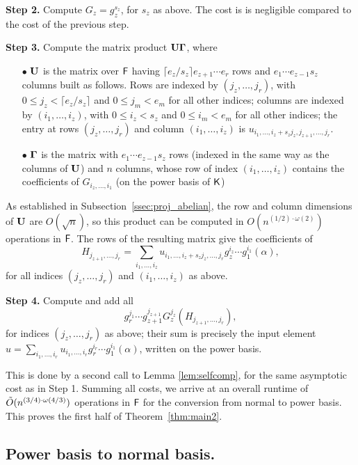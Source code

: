 \smallskip\noindent\textbf{Step 2.} Compute $G_z=g_z^{s_z}$, for $s_z$
as above. The cost is is negligible compared to the cost of the
previous step.

\smallskip\noindent\textbf{Step 3.} Compute the matrix product 
$\mat U \mat \Gamma$, where
\begin{itemize}
\item[$\bullet$] $\mat U$ is the matrix over ${\mathsf{F}}$ having $\lceil
  e_z/s_z\rceil e_{z+1} \cdots e_r$ rows and $e_1 \cdots e_{z-1} s_z$
  columns built as follows. Rows are indexed by $(j_z,\dots,j_r)$,
  with $0\le j_z < \lceil e_z/s_z\rceil$ and $0 \le j_m < e_m$ for all
  other indices; columns are indexed by $(i_1,\dots,i_z)$, with $0\le
  i_z < s_z$ and $0 \le i_m < e_m$ for all other indices; the entry at
  rows $(j_z,\dots,j_r)$ and column $(i_1,\dots,i_z)$ is
  $u_{i_1,\dots,i_z + s_z j_z, j_{z+1},\dots,j_r}$.
\item[$\bullet$] $\mat \Gamma$ is the matrix with $e_1 \cdots e_{z-1}
  s_z$ rows (indexed in the same way as the columns of $\mat U$) and $n$
  columns, whose row of index $(i_1,\dots,i_z)$ contains the
  coefficients of $ G_{i_z,\dots,i_1}$ (on the power basis of ${\mathsf{K}}$)
\end{itemize}
As established in Subsection~\ref{ssec:proj_abelian}, the row and column
dimensions of $\mat U$ are $O(\sqrt n)$, so this product can 
be computed in $O(n^{(1/2)\cdot\omega(2)})$ operations in ${\mathsf{F}}$. The rows of 
the resulting matrix give the coefficients of 
$$ H_{j_{z+1},\dots,j_r} = \sum_{i_1,\dots,i_z} u_{i_1,\dots,i_z+s_z j_z,\dots,j_r} g_z^{i_z} \cdots
g_1^{i_1}(\alpha),$$
for all indices $(j_z,\dots,j_r)$ and $(i_1,\dots,i_z)$ as above.

\smallskip\noindent\textbf{Step 4.} Compute and add all
$$g_r^{j_1} \cdots g_{z+1}^{j_{z+1}} G_z^{j_z} ( H_{j_{z+1},\dots,j_r}
),$$ for indices $(j_z,\dots,j_r)$ as above; their sum is precisely
the input element $u=\sum_{i_1,\dots,i_r} u_{i_1,\dots,i_r} g_r^{i_r}
\cdots g_1^{i_1}(\alpha)$, written on the power basis.

This is done by a second call to Lemma \ref{lem:selfcomp}, for the same
asymptotic cost as in Step 1. Summing all costs, we arrive
at an overall runtime of $\tilde{O}(n^{(3/4)\cdot \omega(4/3)})$ operations in ${\mathsf{F}}$ for
the conversion from normal to power basis. This proves the first 
half of Theorem~\ref{thm:main2}.


\subsection{Power basis to normal basis.}

